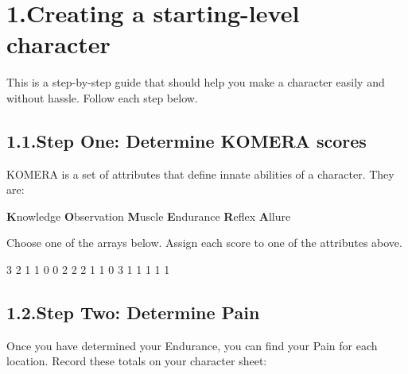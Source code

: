\documentclass{article}
\begin{document}
\section{1.\hspace*{0.5em}Creating a starting-level character}\label{sec-creating-a-starting-level-character}%

\noindent{}This is a step-by-step guide that should help you make a character easily and without hassle. Follow each step below.%

\subsection{1.1.\hspace*{0.5em}Step One: Determine KOMERA scores}\label{sec-step-one--determine-komera-scores}%

\noindent{}KOMERA is a set of attributes that define innate abilities of a character. They are:%

\textbf{K}nowledge\mdbr
{}\textbf{O}bservation\mdbr
{}\textbf{M}uscle\mdbr
{}\textbf{E}ndurance\mdbr
{}\textbf{R}eflex\mdbr
{}\textbf{A}llure %

Choose one of the arrays below. Assign each score to one of the attributes above.%

3 2 1 1 0 0\mdbr
{}2 2 2 1 1 0\mdbr
{}3 1 1 1 1 1 %

\subsection{1.2.\hspace*{0.5em}Step Two: Determine Pain}\label{sec-step-two--determine-pain}%

\noindent{}Once you have determined your Endurance, you can find your Pain for each location. Record these totals on your character sheet:  %
\end{document}
